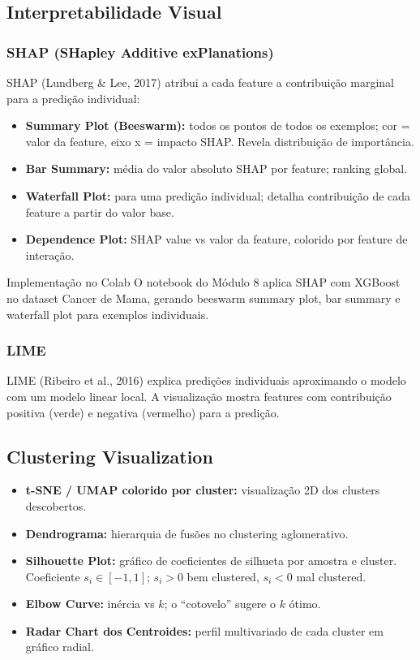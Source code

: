 \documentclass[12pt,a4paper]{article}
\begin{document}
\subsection{Interpretabilidade Visual}

\subsubsection{SHAP (SHapley Additive exPlanations)}

SHAP (Lundberg \& Lee, 2017) atribui a cada feature a contribuição marginal para a predição individual:

\begin{itemize}
  \item \textbf{Summary Plot (Beeswarm):} todos os pontos de todos os exemplos; cor = valor da feature, eixo x = impacto SHAP. Revela distribuição de importância.
  \item \textbf{Bar Summary:} média do valor absoluto SHAP por feature; ranking global.
  \item \textbf{Waterfall Plot:} para uma predição individual; detalha contribuição de cada feature a partir do valor base.
  \item \textbf{Dependence Plot:} SHAP value vs valor da feature, colorido por feature de interação.
\end{itemize}

\begin{dicabox}{Implementação no Colab}
O notebook do Módulo 8 aplica SHAP com XGBoost no dataset Cancer de Mama, gerando beeswarm summary plot, bar summary e waterfall plot para exemplos individuais.
\end{dicabox}

\subsubsection{LIME}

LIME (Ribeiro et al., 2016) explica predições individuais aproximando o modelo com um modelo linear local. A visualização mostra features com contribuição positiva (verde) e negativa (vermelho) para a predição.

\subsection{Clustering Visualization}

\begin{itemize}
  \item \textbf{t-SNE / UMAP colorido por cluster:} visualização 2D dos clusters descobertos.
  \item \textbf{Dendrograma:} hierarquia de fusões no clustering aglomerativo.
  \item \textbf{Silhouette Plot:} gráfico de coeficientes de silhueta por amostra e cluster. Coeficiente $s_i \in [-1, 1]$; $s_i > 0$ bem clustered, $s_i < 0$ mal clustered.
  \item \textbf{Elbow Curve:} inércia vs $k$; o ``cotovelo'' sugere o $k$ ótimo.
  \item \textbf{Radar Chart dos Centroides:} perfil multivariado de cada cluster em gráfico radial.
\end{itemize}
\end{document}
